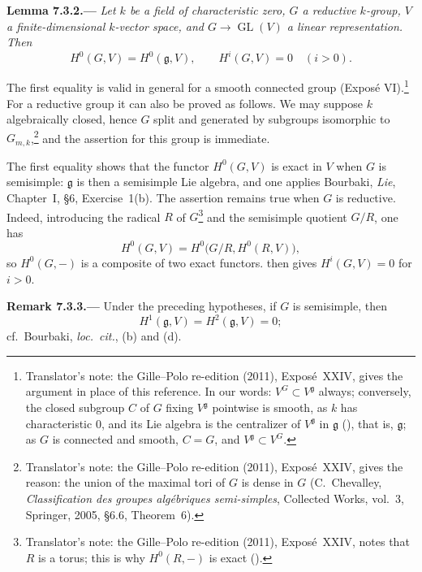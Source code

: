 \par\medskip\noindent{}\textbf{Lemma 7.3.2.---}\enspace
\emph{Let \(k\) be a field of characteristic zero, \(G\) a reductive
\(k\)-group, \(V\) a finite-dimensional \(k\)-vector space, and
\(G\to\operatorname{GL}(V)\) a linear representation. Then
\[
  H^0(G,V)=H^0(\mathfrak g,V),
  \qquad
  H^i(G,V)=0\quad(i>0).
\]}

The first equality is valid in general for a smooth connected
group (Exposé VI).\footnote{Translator's note: the Gille--Polo re-edition (2011), Exposé~XXIV, gives the argument in place of this reference. In our
words: \(V^G\subset V^{\mathfrak g}\) always; conversely, the closed subgroup \(C\) of \(G\) fixing
\(V^{\mathfrak g}\) pointwise is smooth, as \(k\) has characteristic \(0\), and its Lie algebra is
the centralizer of \(V^{\mathfrak g}\) in \(\mathfrak g\) \textup{()}, that is, \(\mathfrak g\); as \(G\) is connected and smooth, \(C=G\), and
\(V^{\mathfrak g}\subset V^G\).} For a reductive group it can also be
proved as follows. We may suppose \(k\) algebraically closed, hence
\(G\) split and generated by subgroups isomorphic to
\(G_{m,k}\),\footnote{Translator's note: the Gille--Polo re-edition (2011), Exposé~XXIV, gives the reason: the union of the maximal tori of
\(G\) is dense in \(G\) (C.~Chevalley, \emph{Classification des groupes algébriques semi-simples},
Collected Works, vol.~3, Springer, 2005, \S6.6, Theorem~6).} and the assertion
for this group is immediate.

The first equality shows that the functor \(H^0(G,V)\) is exact in
\(V\) when \(G\) is semisimple: \(\mathfrak g\) is then a semisimple
Lie algebra, and one applies Bourbaki, \emph{Lie}, Chapter~I, \S6,
Exercise~1(b). The assertion remains true when \(G\) is reductive.
Indeed, introducing the radical \(R\) of
\(G\)\footnote{Translator's note: the Gille--Polo re-edition (2011), Exposé~XXIV, notes that \(R\) is a torus; this is why \(H^0(R,-)\) is exact
\textup{()}.}
and the semisimple quotient \(G/R\), one has
\[
  H^0(G,V)=H^0\bigl(G/R,H^0(R,V)\bigr),
\]
so \(H^0(G,-)\) is a composite of two exact functors. 
then gives \(H^i(G,V)=0\) for \(i>0\).

\par\medskip\noindent{}\textbf{Remark 7.3.3.---}\enspace
Under the preceding hypotheses, if \(G\) is semisimple, then
\[
  H^1(\mathfrak g,V)=H^2(\mathfrak g,V)=0;
\]
cf.\ Bourbaki, \emph{loc.\ cit.}, (b) and (d).

